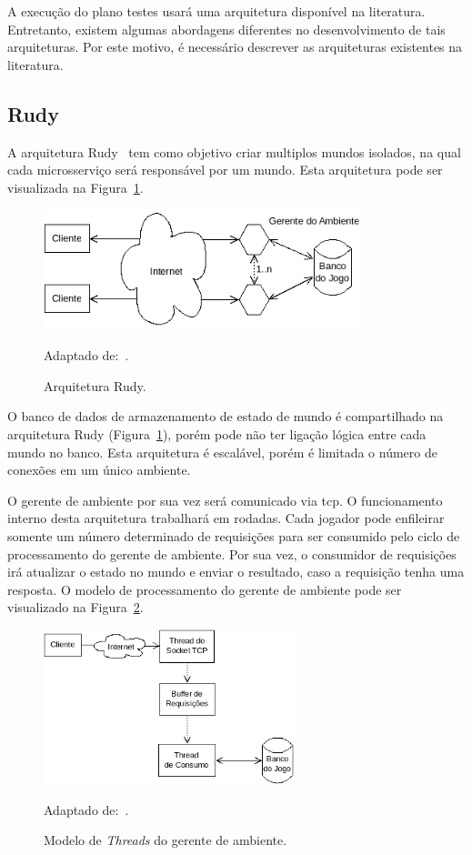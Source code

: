A execução do plano testes usará uma arquitetura disponível na literatura.
%
Entretanto, existem algumas abordagens diferentes no desenvolvimento de tais arquiteturas.
%
Por este motivo, é necessário descrever as arquiteturas existentes na literatura.



\subsection{Rudy}

A arquitetura Rudy~\cite{matthiasrudy2011} tem como objetivo criar multiplos mundos isolados, na qual cada microsserviço será responsável por um mundo.
%
Esta arquitetura pode ser visualizada na Figura~\ref{rudy}.


\begin{figure}[htb!]
  \caption{Arquitetura Rudy.}
  \label{rudy}
  \includegraphics[height=3.5cm]{img/cap3/rudy.png}
  \centering

  Adaptado de:~\cite{matthiasrudy2011}.
\end{figure}

O banco de dados de armazenamento de estado de mundo é compartilhado na arquitetura Rudy (Figura~\ref{rudy}), porém pode não ter ligação lógica entre cada mundo no banco.
%
Esta arquitetura é escalável, porém é limitada o número de conexões em um único ambiente.



O gerente de ambiente por sua vez será comunicado via \ac{tcp}.
%
O funcionamento interno desta arquitetura trabalhará em rodadas.
%
Cada jogador pode enfileirar somente um número determinado de requisições para ser consumido pelo ciclo de processamento do gerente de ambiente.
%
Por sua vez, o consumidor de requisições irá atualizar o estado no mundo e enviar o resultado, caso a requisição tenha uma resposta.
%
O modelo de processamento do gerente de ambiente pode ser visualizado na Figura~\ref{fig:processamento}.



\begin{figure}[htb!]
  \caption{Modelo de \textit{Threads} do gerente de ambiente.}
  \label{fig:processamento}
  \includegraphics[height=4.5cm]{img/cap3/thread_model.png}
  \centering

  Adaptado de:~\cite{matthiasrudy2011}.
\end{figure}

